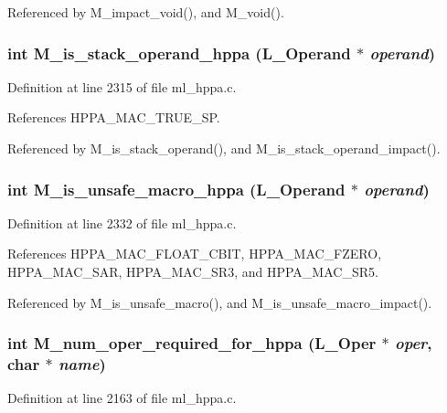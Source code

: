 Referenced by M\_\-impact\_\-void(), and M\_\-void().
\subsubsection{\setlength{\rightskip}{0pt plus 5cm}int M\_\-is\_\-stack\_\-operand\_\-hppa (L\_\-Operand $\ast$ {\em operand})}\label{ml__hppa_8c_e9ac64bbabc572e56d9e4b5306c0745a}




Definition at line 2315 of file ml\_\-hppa.c.

References HPPA\_\-MAC\_\-TRUE\_\-SP.

Referenced by M\_\-is\_\-stack\_\-operand(), and M\_\-is\_\-stack\_\-operand\_\-impact().
\subsubsection{\setlength{\rightskip}{0pt plus 5cm}int M\_\-is\_\-unsafe\_\-macro\_\-hppa (L\_\-Operand $\ast$ {\em operand})}\label{ml__hppa_8c_0f3990ca95608d8d793b81daf3eebd38}




Definition at line 2332 of file ml\_\-hppa.c.

References HPPA\_\-MAC\_\-FLOAT\_\-CBIT, HPPA\_\-MAC\_\-FZERO, HPPA\_\-MAC\_\-SAR, HPPA\_\-MAC\_\-SR3, and HPPA\_\-MAC\_\-SR5.

Referenced by M\_\-is\_\-unsafe\_\-macro(), and M\_\-is\_\-unsafe\_\-macro\_\-impact().
\subsubsection{\setlength{\rightskip}{0pt plus 5cm}int M\_\-num\_\-oper\_\-required\_\-for\_\-hppa (L\_\-Oper $\ast$ {\em oper}, char $\ast$ {\em name})}\label{ml__hppa_8c_89b059fb225665f4f6772c31ed7af1d7}




Definition at line 2163 of file ml\_\-hppa.c.

